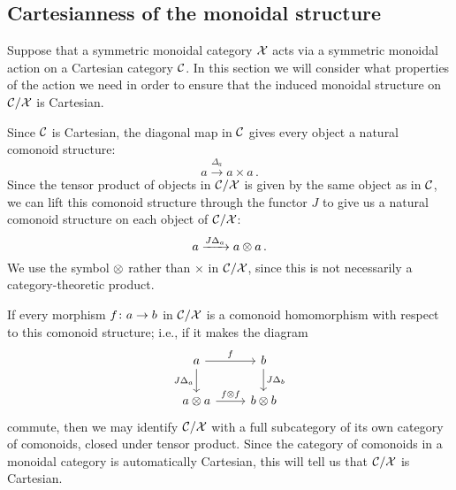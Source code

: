 \documentclass{article}
\begin{document}
\subsection{Cartesianness of the monoidal structure}

Suppose that a symmetric monoidal category $\mathcal X$ acts via a symmetric monoidal action on a Cartesian category ${\mathcal{C}}$.  
In this section we will consider what properties of the action we need in order to ensure that the induced monoidal structure on ${\mathcal{C}}/\mathcal X$ is Cartesian.

Since ${\mathcal{C}}$ is Cartesian, the diagonal map in ${\mathcal{C}}$ gives every object a natural comonoid structure:
\[
  a \xrightarrow{\Delta_a} a \times a\,.
  \]
Since the tensor product of objects in ${\mathcal{C}}/\mathcal X$ is given by the same object as in ${\mathcal{C}}$, we can lift this comonoid structure through the functor $J$ to give us a natural comonoid structure on each object of ${\mathcal{C}}/\mathcal X$:
\[
  a \xrightarrow{J\Delta_a} a \otimes a\,.
  \]
We use the symbol $\otimes$ rather than $\times$ in ${\mathcal{C}}/\mathcal X$, since this is not necessarily a category-theoretic product.

If every morphism $f\colon a \to b$ in ${\mathcal{C}}/\mathcal X$ is a comonoid homomorphism with respect to this comonoid structure; i.e., if it makes the diagram
\[
  \begin{tikzcd}
    a \arrow[r, "f"] \arrow[d, "J\Delta_a"']
      & b \arrow[d, "J\Delta_b"] \\
    a \tensor a \arrow[r, "f\tensor f"]
      & b \tensor b
  \end{tikzcd}
  \]
commute, then we may identify ${\mathcal{C}}/\mathcal X$ with a full subcategory of its own category of comonoids, closed under tensor product.  
Since the category of comonoids in a monoidal category is automatically Cartesian, this will tell us that ${\mathcal{C}}/\mathcal X$ is Cartesian.  
\end{document}
